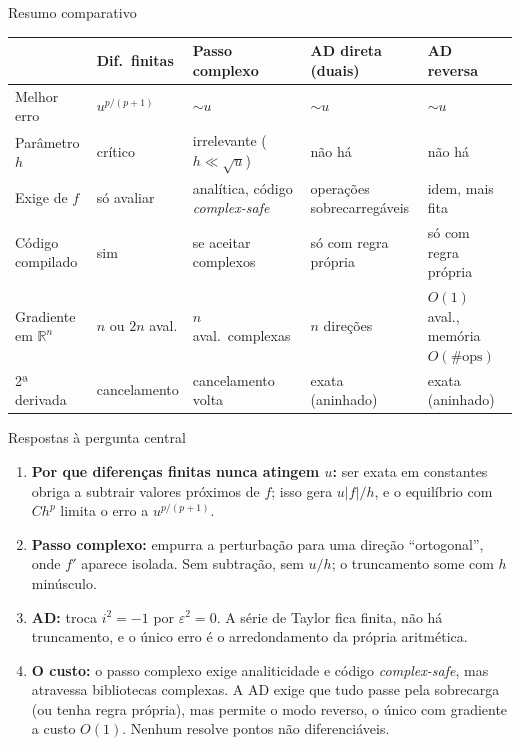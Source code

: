 \documentclass[aspectratio=169,11pt]{beamer}
\begin{document}
\begin{frame}{Resumo comparativo}
  \centering\footnotesize
  \renewcommand{\arraystretch}{1.3}
  \begin{tabular}{L{2.2cm}L{2.2cm}L{2.8cm}L{2.8cm}L{2.6cm}}
    \toprule
    & Dif.\ finitas & Passo complexo & AD direta (duais) & AD reversa \\
    \midrule
    Melhor erro & $u^{p/(p+1)}$ & $\sim u$ & $\sim u$ & $\sim u$ \\
    Parâmetro $h$ & crítico & irrelevante ($h\ll\sqrt u$) & não há & não há \\
    Exige de $f$ & só avaliar & analítica, código \emph{complex-safe} & operações sobrecarregáveis & idem, mais fita \\
    Código compilado & sim & se aceitar complexos & só com regra própria & só com regra própria \\
    Gradiente em $\mathbb R^n$ & $n$ ou $2n$ aval. & $n$ aval.\ complexas & $n$ direções & $O(1)$ aval., memória $O(\#\text{ops})$ \\
    2ª derivada & cancelamento & cancelamento volta & exata (aninhado) & exata (aninhado) \\
    \bottomrule
  \end{tabular}
\end{frame}

\begin{frame}{Respostas à pergunta central}
  \begin{enumerate}
    \setlength{\itemsep}{0.6em}
    \item \textbf{Por que diferenças finitas nunca atingem $u$:} ser exata em constantes obriga a subtrair valores próximos de $f$; isso gera $u|f|/h$, e o equilíbrio com $Ch^p$ limita o erro a $u^{p/(p+1)}$.
    \item \textbf{Passo complexo:} empurra a perturbação para uma direção ``ortogonal'', onde $f'$ aparece isolada. Sem subtração, sem $u/h$; o truncamento some com $h$ minúsculo.
    \item \textbf{AD:} troca $i^2=-1$ por $\varepsilon^2=0$. A série de Taylor fica finita, não há truncamento, e o único erro é o arredondamento da própria aritmética.
    \item \textbf{O custo:} o passo complexo exige analiticidade e código \emph{complex-safe}, mas atravessa bibliotecas complexas. A AD exige que tudo passe pela sobrecarga (ou tenha regra própria), mas permite o modo reverso, o único com gradiente a custo $O(1)$. Nenhum resolve pontos não diferenciáveis.
  \end{enumerate}
\end{frame}
\end{document}
